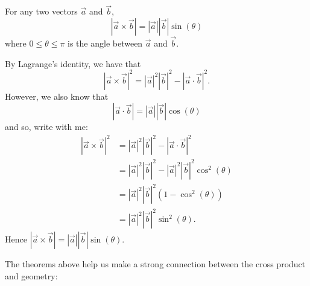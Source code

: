 \documentclass{ximera}
\begin{document}
\begin{theorem}
  For any two vectors $\vec{a}$ and $\vec{b}$,
  \[
  |\vec{a} \times \vec{b}| = |\vec{a}||\vec{b}|\sin(\theta)
  \]
  where $0\le \theta\le\pi$ is the angle between $\vec{a}$ and
  $\vec{b}$.
  \begin{explanation}
    By Lagrange's identity, we have that
    \[
    |\vec{a}\times\vec{b}|^2 = |\vec{a}|^2 |\vec{b}|^2 - |\vec{a}\cdot\vec{b}|^2.
    \]
    However, we also know that
    \[
    |\vec{a} \cdot\vec{b}| = |\vec{a}| |\vec{b}|\cos(\theta)
    \]
    and so, write with me:
    \begin{align*}
      |\vec{a}\times\vec{b}|^2 &= |\vec{a}|^2 |\vec{b}|^2 - |\vec{a}\cdot\vec{b}|^2\\
      &= |\vec{a}|^2 |\vec{b}|^2 - |\vec{a}|^2 |\vec{b}|^2\cos^2(\theta)\\
      &= |\vec{a}|^2 |\vec{b}|^2(1 - \cos^2(\theta))\\
      &= |\vec{a}|^2 |\vec{b}|^2\sin^2(\theta).
    \end{align*}
    Hence $|\vec{a} \times \vec{b}| = |\vec{a}||\vec{b}|\sin(\theta)$.
  \end{explanation}
\end{theorem}

The theorems above help us make a strong connection between the cross
product and geometry:
\end{document}
